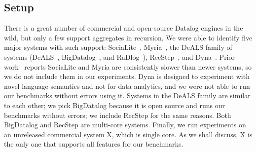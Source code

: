     \subsection{Setup}
    
    
    There is a great number of commercial and open-source Datalog engines in the
    wild, but only a few support aggregates in recursion.
    We were able to identify five major systems with such support:
    SociaLite~\cite{DBLP:journals/tkde/SeoGL15},
    Myria~\cite{10.14778/2824032.2824052}, the DeALS family of systems
    (DeALS~\cite{DBLP:conf/icde/ShkapskyYZ15},
    BigDatalog~\cite{DBLP:conf/sigmod/ShkapskyYICCZ16}, and
    RaDlog~\cite{DBLP:conf/sigmod/0001WMSYDZ19}),
    RecStep~\cite{DBLP:journals/pvldb/FanZZAKP19}, and
    Dyna~\cite{francislandau-vieira-eisner-2020-wrla}.
    Prior work~\cite{BigDatalog} reports SociaLite and Myria are consistently slower than
    newer systems, so we do not include them in our experiments.
    Dyna is designed to experiment with novel language semantics and
    not for data analytics, and we were not able to run our benchmarks
    without errors using it.
    Systems in the DeALS family are similar to each other;
    we pick BigDatalog because it is open source
    and runs our benchmarks without errors;
    we include RecStep for the same reasons.
    Both BigDatalog and RecStep are multi-core systems.
    Finally, we run experiments on an unreleased commercial system X,
    which is single core.
    As we shall discuss, X is the only one that supports all features for
    our benchmarks.
    
